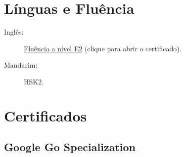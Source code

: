 \documentclass[letterpaper]{../cls/twentysecondcv} %
\begin{document}
\vspace{0.2cm}
\section{Línguas e Fluência}

\begin{description}
\item[Inglês:] \href{https://www.efset.org/cert/hqg62J}{Fluência a nível E2} (clique para abrir o certificado).
\item[Mandarim:] HSK2.
\end{description}

\vspace{0.2cm}



\newpage %

\makeprofileNoExtra %

\section{\LARGE{Certificados}}
\subsection{\textbf{Google Go Specialization}}




\end{document}
